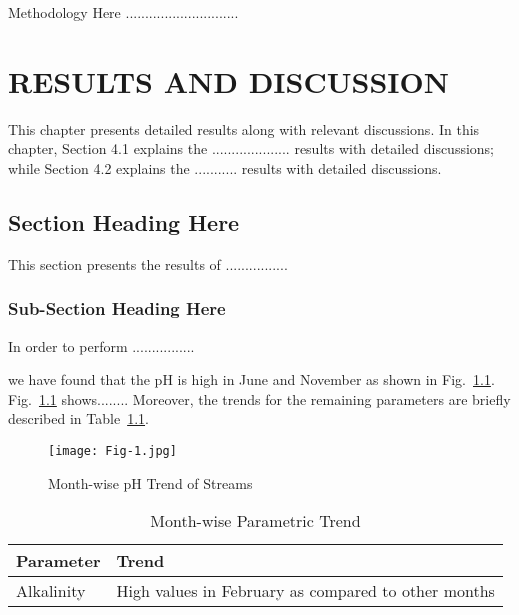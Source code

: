 \documentclass[12pt,a4paper,oneside]{book} %
\begin{document}
Methodology Here .............................

\chapter{RESULTS AND DISCUSSION}\label{c-results}

This chapter presents detailed results along with relevant discussions. In this chapter, Section 4.1 explains the .................... results with detailed discussions; while Section 4.2 explains the ........... results with detailed discussions.

\section{Section Heading Here}

This section presents the results of ................

\subsection{Sub-Section Heading Here}

In order to perform ................

we have found that the pH is high in June and November as shown in Fig.~\ref{fig:Fig4}.  Fig.~\ref{fig:Fig4} shows........ Moreover, the trends for the remaining parameters are briefly described in Table~\ref{table:table13}.

\begin{figure}[!t]
  \centering
  \texttt{[image: Fig-1.jpg]}
  \caption{Month-wise pH Trend of Streams}
  \label{fig:Fig4}
\end{figure}

\begin{table}[!t]
  \begin{center}\scriptsize
      \renewcommand{\arraystretch}{1.3}
      \caption{Month-wise Parametric Trend}
      \label{table:table13}
      \begin{tabular}{ll}
          \hline\hline
              {\bfseries Parameter} & {\bfseries Trend} \\
              \hline                                      %
              Alkalinity & High values in February as compared to other months\\
              \hline                          %
      \end{tabular}
  \end{center}
\end{table}
\end{document}
